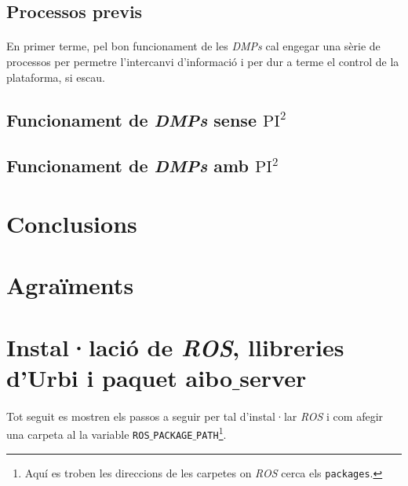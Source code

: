 \documentclass[12pt,a4paper,final,twoside]{article}
\begin{document}
\subsection{Processos previs}

\paragraph{}En primer terme, pel bon funcionament de les \textit{DMPs} cal engegar una sèrie de processos per permetre l'intercanvi d'informació i per dur a terme el control de la plataforma, si escau.


\subsection{Funcionament de \textit{DMPs} sense $\mathrm{PI^2}$}
\subsection{Funcionament de \textit{DMPs} amb $\mathrm{PI^2}$}


\newpage
\section{Conclusions}

\newpage
\section*{Agraïments}

\newpage




\label{Referencies}


\appendix
\clearpage %
\addappheadtotoc
\appendixpage

\section{Instal·lació de \textit{ROS}, llibreries d'Urbi i paquet aibo$\_$server}

\paragraph{}Tot seguit es mostren els passos a seguir per tal d'instal·lar \textit{ROS} i com afegir una carpeta al la variable \texttt{ROS$\_$PACKAGE$\_$PATH}\footnote{Aquí es troben les direccions de les carpetes on \textit{ROS} cerca els \texttt{packages}.}.
\end{document}
